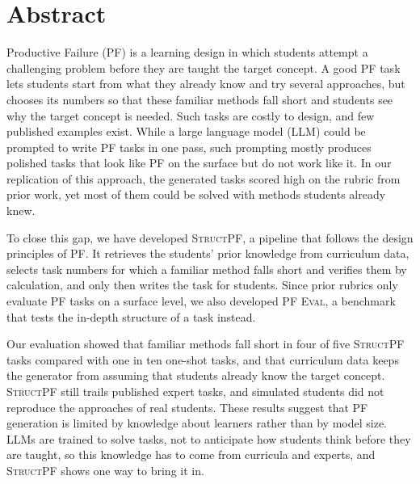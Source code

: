\newpage
\vspace{3cm}

\chapter*{Abstract}
Productive Failure (PF) is a learning design in which students attempt a challenging problem before they are taught the target concept. A good PF task lets students start from what they already know and try several approaches, but chooses its numbers so that these familiar methods fall short and students see why the target concept is needed. Such tasks are costly to design, and few published examples exist. While a large language model (LLM) could be prompted to write PF tasks in one pass, such prompting mostly produces polished tasks that look like PF on the surface but do not work like it. In our replication of this approach, the generated tasks scored high on the rubric from prior work, yet most of them could be solved with methods students already knew.

To close this gap, we have developed \textsc{StructPF}, a pipeline that follows the design principles of PF. It retrieves the students' prior knowledge from curriculum data, selects task numbers for which a familiar method falls short and verifies them by calculation, and only then writes the task for students. Since prior rubrics only evaluate PF tasks on a surface level, we also developed \textsc{PF Eval}, a benchmark that tests the in-depth structure of a task instead.

Our evaluation showed that familiar methods fall short in four of five \textsc{StructPF} tasks compared with one in ten one-shot tasks, and that curriculum data keeps the generator from assuming that students already know the target concept. \textsc{StructPF} still trails published expert tasks, and simulated students did not reproduce the approaches of real students. These results suggest that PF generation is limited by knowledge about learners rather than by model size. LLMs are trained to solve tasks, not to anticipate how students think before they are taught, so this knowledge has to come from curricula and experts, and \textsc{StructPF} shows one way to bring it in.
